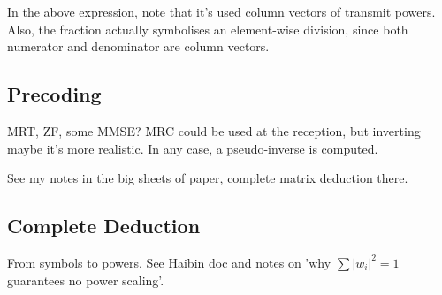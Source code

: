 In the above expression, note that it's used column vectors of transmit powers. Also, the fraction actually symbolises an element-wise division, since both numerator and denominator are column vectors.








\subsection{Precoding} \label{sec:precoding}
MRT, ZF, some MMSE?
MRC could be used at the reception, but inverting maybe it's more realistic. 
In any case, a pseudo-inverse is computed.



See my notes in the big sheets of paper, complete matrix deduction there.



\subsection{Complete Deduction} \label{sec:comp_deduction}
From symbols to powers. See Haibin doc and notes on 'why $\sum|w_i|^2 = 1$ guarantees no power scaling'.




